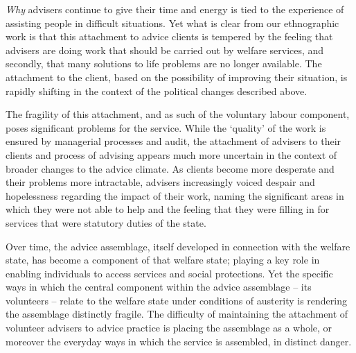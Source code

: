 \par
\textit{Why} advisers continue to give their time and energy is tied to the experience of assisting people in difficult situations. Yet what is clear from our ethnographic work is that this attachment to advice clients is tempered by the feeling that advisers are doing work that should be carried out by welfare services, and secondly, that many solutions to life problems are no longer available. The attachment to the client, based on the possibility of improving their situation, is rapidly shifting in the context of the political changes described above.
\par
The fragility of this attachment, and as such of the voluntary labour component, poses significant problems for the service. While the ‘quality’ of the work is ensured by managerial processes and audit, the attachment of advisers to their clients and process of advising appears much more uncertain in the context of broader changes to the advice climate. As clients become more desperate and their problems more intractable, advisers increasingly voiced despair and hopelessness regarding the impact of their work, naming the significant areas in which they were not able to help and the feeling that they were filling in for services that were statutory duties of the state.
\par
Over time, the advice assemblage, itself developed in connection with the welfare state, has become a component of that welfare state; playing a key role in enabling individuals to access services and social protections. Yet the specific ways in which the central component within the advice assemblage – its volunteers – relate to the welfare state under conditions of austerity is rendering the assemblage distinctly fragile. The difficulty of maintaining the attachment of volunteer advisers to advice practice is placing the assemblage as a whole, or moreover the everyday ways in which the service is assembled, in distinct danger. 

